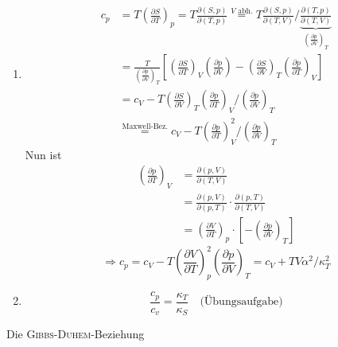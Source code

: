 \begin{enumerate}  %
  \item
  \begin{equation}
  \begin{split}
    c_p &=  T \left( \frac{\partial S}{\partial T} \right)_p = T \frac{\partial(S, p)}{\partial(T, p)} \overset{\text{$V$ abh.}}{=}
    T \frac{\partial(S, p)}{\partial(T, V)} / \underbrace{\frac{\partial(T, p)}{\partial(T, V)}}_{ \left( \frac{\partial p}{\partial V} \right)_T} \\ 
    &= \frac{T}{ \left( \frac{\partial p}{\partial V} \right)_T} \left[ \left( \frac{\partial S}{\partial T} \right)_V 
    \left( \frac{\partial p}{\partial V} \right) - \left( \frac{\partial S}{\partial V} \right)_T \left( \frac{\partial p}{\partial T} \right)_V \right] \\
    &= c_V - T \left( \frac{\partial S}{\partial V} \right)_T \left( \frac{\partial p}{\partial T} \right)_V / \left( \frac{\partial p}{\partial V} \right)_T \\
    &\overset{\text{Maxwell-Bez.}}{=} c_V - T \left( \frac{\partial p}{\partial T} \right)_V^2 / \left( \frac{\partial p}{\partial V} \right)_T
  \end{split}
  \end{equation}
  Nun ist
  \begin{equation}
  \begin{split}
    \left( \frac{\partial p}{\partial T} \right)_V &= \frac{\partial(p, V)}{\partial (T, V)} \\
     &= \frac{\partial (p, V)}{\partial (p, T)} \cdot \frac{\partial(p, T)}{\partial(T, V)} \\
     &= \left( \frac{\partial V}{\partial T} \right)_p \cdot \left[ - \left( \frac{\partial p}{\partial V} \right)_T \right]
  \end{split}
  \end{equation}
  \begin{equation}
    \Rightarrow c_p = c_V - T \left( \frac{\partial V}{\partial T} \right)_p^2 \left( \frac{\partial p}{\partial V} \right)_T = c_V + T V \alpha^2 / \kappa_T^2
  \end{equation}
  \item 
  \begin{equation}
    \frac{c_p}{c_v} = \frac{\kappa_T}{\kappa_S} \quad \text{(Übungsaufgabe)}
  \end{equation}
\end{enumerate}
Die \textsc{Gibbs}-\textsc{Duhem}-Beziehung \\
